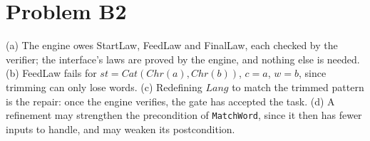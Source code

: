 \documentclass[11pt]{article}
\begin{document}
\section*{Problem B2}\label{ans:B2}
\begin{answer}
(a) The engine owes StartLaw, FeedLaw and FinalLaw, each checked by the verifier;
the interface's laws are proved by the engine, and nothing else is needed.
(b) FeedLaw fails for $st = \mathit{Cat}(\mathit{Chr}(a), \mathit{Chr}(b))$,
$c = a$, $w = b$, since trimming can only lose words.
(c) Redefining $\mathit{Lang}$ to match the trimmed pattern is the repair: once the
engine verifies, the gate has accepted the task.
(d) A refinement may strengthen the precondition of \texttt{MatchWord}, since it
then has fewer inputs to handle, and may weaken its postcondition.
\end{answer}
\end{document}
